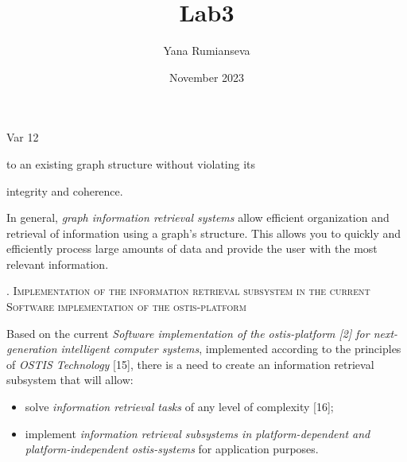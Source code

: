 \documentclass[10pt, twocolumn, a4paper]{article}
\title{Lab3}
\author{\huge Yana Rumianseva}
\date{November 2023}
\begin{document}
\maketitle 
\begin{center}
   \large Var 12
\end{center}



\clearpage


 to an existing graph structure without violating its
 \par  integrity and coherence.
 
\par In general,  \textit{graph information retrieval systems} allow
efficient organization and retrieval of information using
a graph’s structure. This allows you to quickly and
efficiently process large amounts of data and provide
the user with the most relevant information. 

  \begin{center}
   
  \vspace{-4pt}

{ \scshape {}. Implementation of the information retrieval subsystem in the current Software implementation of the ostis-platform }
\end{center}
\vspace{-6pt}
    
\par Based on the current  \textit { Software implementation of the
ostis-platform \emph{[2]} for next-generation intelligent computer
systems}, implemented according to the principles of
 \textit {OSTIS Technology} [15], there is a need to create an
information retrieval subsystem that will allow:
\vspace{-7pt}
\begin{itemize}
\setlength\itemsep{4pt}
\item solve \textit {information retrieval tasks} of any level of
complexity [16];
\item implement \textit {information retrieval subsystems \emph{in}
platform-dependent \emph{and} platform-independent ostis-systems} for application purposes.
\end{itemize}
\vspace{5pt}
\end{document}
